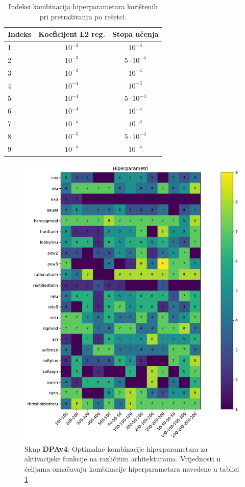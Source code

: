 \documentclass[times, utf8, numeric, diplomski]{fer}
\begin{document}
\begin{table}
\centering
\begin{tabular}{lcc}
Indeks & Koeficijent L2 reg. & Stopa učenja \\
\hline
1 & $10^{-3}$ & $10^{-3}$  \\
2 & $10^{-3}$ & $5 \cdot 10^{-4}$ \\
3 & $10^{-3}$ & $10^{-4}$ \\
4 & $10^{-4}$ & $10^{-3}$ \\
5 & $10^{-4}$ & $5 \cdot 10^{-4}$ \\
6 & $10^{-4}$ & $10^{-4}$ \\
7 & $10^{-5}$ & $10^{-3}$ \\
8 & $10^{-5}$ & $5 \cdot 10^{-4}$ \\
9 & $10^{-5}$ & $10^{-4}$
\end{tabular}
\caption{Indeksi kombinacija hiperparametara korištenih pri pretraživanju po rešetci.}
\label{tab:hp_comb}
\end{table}

\begin{figure}[ht]
\includegraphics[width=\textwidth]{greedy_9_hp.pdf}
\centering
\caption{Skup \textbf{DPAv4}: Optimalne kombinacije hiperparametara za aktivacijske funkcije na različitim arhitekturama. Vrijednosti u ćelijama označavaju kombinacije hiperparametara navedene u tablici \ref{tab:hp_comb}}
\label{fig:greedy_9_hp}
\end{figure}
\end{document}
